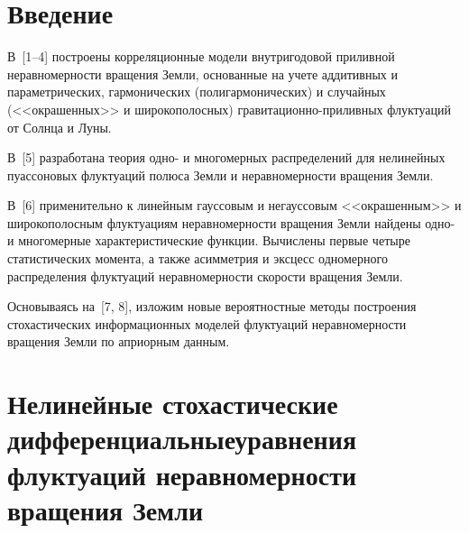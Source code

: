       \begin{multicols}{2}

      \label{st\stat}

      
\section{Введение}

В~[1--4] построены корреляционные  модели внутригодовой приливной неравномерности
вращения Земли, основанные на учете аддитивных и параметрических, гармонических (полигармонических) и случайных  (<<окрашенных>>  и широкополосных)
гравитационно-прилив\-ных флуктуаций  от Солнца и Луны.

В~[5] разработана теория одно- и многомерных распределений для нелинейных пуассоновых флуктуаций полюса
 Земли и неравномерности вращения Земли.

В~[6] применительно к линейным гауссовым и негауссовым <<окрашенным>> и широкополосным
флуктуациям неравномерности вращения Земли найдены одно-
и многомерные характеристические функции. Вычислены первые четыре статистических момента, а также
асимметрия и эксцесс одномерного распределения флуктуаций неравномерности скорости вращения Земли.

Основываясь на~[7, 8], изложим новые вероятностные методы построения стохастических информационных моделей
флуктуаций неравномерности вращения Земли по априорным данным.


\section{Нелинейные стохастические дифференциальные\break уравнения флуктуаций неравномерности вращения Земли}


\end{multicols}
